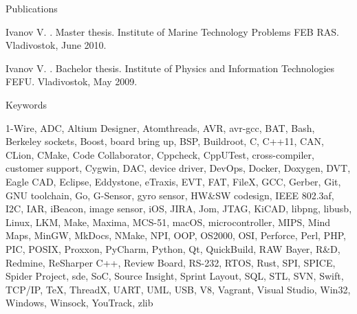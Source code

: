 \documentclass{template}
\begin{document}

\begin{rSection}{Publications}
\begin{rItemize}

\item Ivanov V. . Master thesis. \newline
      Institute of Marine Technology Problems FEB RAS. Vladivostok, June 2010.
\item Ivanov V. . Bachelor thesis. \newline
      Institute of Physics and Information Technologies FEFU. Vladivostok, May 2009.

\end{rItemize}
\end{rSection}


\begin{rSection}{Keywords}

1-Wire, ADC, Altium Designer, Atomthreads, AVR, avr-gcc, BAT, Bash, Berkeley sockets, Boost, board bring up, BSP, Buildroot, C, C++11, CAN,
CLion, CMake, Code Collaborator, Cppcheck, CppUTest, cross-compiler, customer support, Cygwin, DAC, device driver, DevOps, Docker, Doxygen, DVT, Eagle CAD, Eclipse,
Eddystone, eTraxis, EVT, FAT, FileX, GCC, Gerber, Git, GNU toolchain, Go, G-Sensor, gyro sensor, HW\&SW codesign, IEEE 802.3af, I2C, IAR, iBeacon,
image sensor, iOS, JIRA, Jom, JTAG, KiCAD, libpng, libusb, Linux, LKM, Make, Maxima, MCS-51, macOS, microcontroller, MIPS, Mind Maps, MinGW,
MkDocs, NMake, NPI, OOP, OS2000, OSI, Perforce, Perl, PHP, PIC, POSIX, Proxxon, PyCharm, Python, Qt, QuickBuild, RAW Bayer, R\&D, Redmine, ReSharper
C++, Review Board, RS-232, RTOS, Rust, SPI, SPICE, Spider Project, sde, SoC, Source Insight, Sprint Layout, SQL, STL, SVN, Swift, TCP/IP, \TeX,
ThreadX, UART, UML, USB, V8, Vagrant, Visual Studio, Win32, Windows, Winsock, YouTrack, zlib

\end{rSection}

\end{document}
